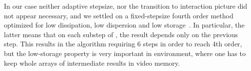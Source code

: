 In our case neither adaptive stepsize, nor the transition to interaction picture did not appear necessary, and we settled on a fixed-stepsize fourth order  method optimized for low dissipation, low dispersion and low storage~\cite{Berland2006}.
In particular, the latter means that on each substep of , the result depends only on the previous step.
This results in the algorithm requiring 6 steps in order to reach 4th order, but the low-storage property is very important in  environment, where one has to keep whole arrays of intermediate results in video memory.
